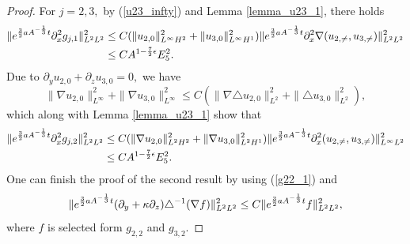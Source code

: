 \documentclass[12pt, reqno]{amsart}
\numberwithin{equation}{section}
\begin{document}
\begin{proof}
		For $j=2,3,$  by (\ref{u23_infty}) and Lemma \ref{lemma_u23_1}, there holds
		\begin{equation}\label{g31_1}
			\begin{aligned}
				\|{\rm e}^{\frac32aA^{-\frac{1}{3}}t}
				\partial_x^2 g_{j,1}\|^2_{L^2L^2}
				&\leq C(\|u_{2,0}\|^2_{L^{\infty}H^2}
				+\|u_{3,0}\|^2_{L^{\infty}H^1})
				\|{\rm e}^{\frac32aA^{-\frac{1}{3}}t}  \partial_x^2\nabla(u_{2,\neq},u_{3,\neq}) \|^2_{L^2L^2}\\
				&\leq CA^{1-\frac{7}{2}\epsilon}E_5^2.
			\end{aligned}
		\end{equation}
		Due to $\partial_yu_{2,0}+\partial_zu_{3,0}=0,$
		we have 
		$$\|\nabla u_{2,0}\|^2_{L^{\infty}}
		+\|\nabla u_{3,0}\|^2_{L^{\infty}}
		\leq C(\|\nabla\triangle u_{2,0}\|^2_{L^{2}}
		+\|\triangle u_{3,0}\|^2_{L^{2}}),$$
		which along with Lemma \ref{lemma_u23_1} show that 
		\begin{equation}\label{g22_1}
			\begin{aligned}
				\|{\rm e}^{\frac32aA^{-\frac{1}{3}}t}
				\partial_x^2 g_{j,2}\|^2_{L^2L^2}
				&\leq C(\|\nabla u_{2,0}\|^2_{L^{2}H^2}
				+\|\nabla u_{3,0}\|^2_{L^{2}H^1})
				\|{\rm e}^{\frac32aA^{-\frac{1}{3}}t}  \partial_x^2(u_{2,\neq},u_{3,\neq}) \|^2_{L^{\infty}L^2}\\
				&\leq CA^{1-\frac{7}{2}\epsilon}E_5^2.
			\end{aligned}
		\end{equation}
		One can finish the proof of the second result by using (\ref{g22_1}) and 
		$$\|{\rm e}^{\frac32aA^{-\frac{1}{3}}t}
		(\partial_y+\kappa\partial_z)\triangle^{-1}(\nabla f)\|^2_{L^2L^2}
		\leq C\|{\rm e}^{\frac32aA^{-\frac{1}{3}}t}f \|^2_{L^2L^2},$$
		where $f$ is selected form $g_{2,2}$ and $g_{3,2}.$
	\end{proof}
	
\end{document}
